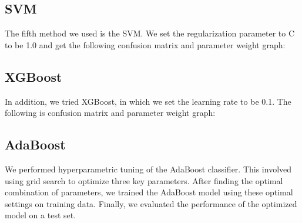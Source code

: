 \documentclass[12pt]{article}
\begin{document}
\subsection{SVM}
The fifth method we used is the SVM. We set the regularization parameter to C to be 1.0 and get the following confusion matrix and parameter weight graph:

\subsection{XGBoost}
In addition, we tried XGBoost, in which we set the learning rate to be 0.1. The following is confusion matrix and parameter weight graph:

\subsection{AdaBoost}
We performed hyperparametric tuning of the AdaBoost classifier. This involved using grid search to optimize three key parameters. After finding the optimal combination of parameters, we trained the AdaBoost model using these optimal settings on training data. Finally, we evaluated the performance of the optimized model on a test set.
\end{document}
